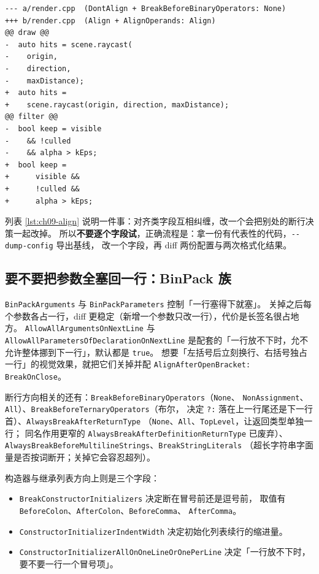 \documentclass[12pt,a4paper,fontset=fandol]{ctexbook}
\newcommand{\Opt}[1]{\texttt{-\/-#1}}
\newcommand{\Bk}{\discretionary{}{}{}}
\begin{document}
\begin{lstlisting}[style=diffstyle,caption={\texttt{AlignAfterOpenBracket} 与 \texttt{AlignOperands} 的可见差别},label={lst:ch09-align}]
--- a/render.cpp  (DontAlign + BreakBeforeBinaryOperators: None)
+++ b/render.cpp  (Align + AlignOperands: Align)
@@ draw @@
-  auto hits = scene.raycast(
-    origin,
-    direction,
-    maxDistance);
+  auto hits =
+    scene.raycast(origin, direction, maxDistance);
@@ filter @@
-  bool keep = visible
-    && !culled
-    && alpha > kEps;
+  bool keep =
+      visible &&
+      !culled &&
+      alpha > kEps;
\end{lstlisting}

列表 \ref{lst:ch09-align} 说明一件事：对齐类字段互相纠缠，改一个会把别处的断行决策一起改掉。
所以\textbf{不要逐个字段试}，正确流程是：拿一份有代表性的代码，\Opt{dump-config} 导出基线，
改一个字段，再 diff 两份配置与两次格式化结果。

\subsection{要不要把参数全塞回一行：BinPack 族}\label{sec:ch09-s4-binpack}

\texttt{BinPackArguments} 与 \texttt{BinPackParameters} 控制「一行塞得下就塞」。
关掉之后每个参数各占一行，diff 更稳定（新增一个参数只改一行），代价是长签名很占地方。
\texttt{AllowAllArgumentsOnNextLine} 与 \texttt{AllowAllParametersOf\-Declara\-tion\-On\-NextLine}
是配套的「一行放不下时，允不允许整体挪到下一行」，默认都是 \texttt{true}。
想要「左括号后立刻换行、右括号独占一行」的视觉效果，就把它们关掉并配
\texttt{AlignAfterOpenBracket: BreakOnClose}。

断行方向相关的还有：\texttt{Break{\Bk}Before\Bk Binary{\Bk}Operators}（\texttt{None}、
\texttt{Non{\Bk}Assignment}、\texttt{All}）、\texttt{Break{\Bk}Before\Bk Ternary{\Bk}Operators}（布尔，
决定 \texttt{?:} 落在上一行尾还是下一行首）、\texttt{Always{\Bk}Break\Bk After{\Bk}Return{\Bk}Type}
（\texttt{None}、\texttt{All}、\texttt{TopLevel}，让返回类型单独一行；
同名作用更窄的 \texttt{Always{\Bk}Break\Bk After{\Bk}Definition\Bk Return{\Bk}Type} 已废弃）、
\texttt{Always{\Bk}Break\Bk Before{\Bk}Multiline{\Bk}Strings}、\texttt{Break{\Bk}String{\Bk}Literals}
（超长字符串字面量是否按词断开；关掉它会容忍超列）。

构造器与继承列表方向上则是三个字段：

\begin{itemize}
  \item \texttt{BreakConstructorInitializers} 决定断在冒号前还是逗号前，
    取值有 \texttt{BeforeColon}、\texttt{AfterColon}、\texttt{BeforeComma}、
    \texttt{AfterComma}。
  \item \texttt{ConstructorInitializerIndentWidth} 决定初始化列表续行的缩进量。
  \item \texttt{ConstructorInitializerAllOnOneLineOrOnePerLine}
    决定「一行放不下时，要不要一行一个冒号项」。
\end{itemize}
\end{document}
